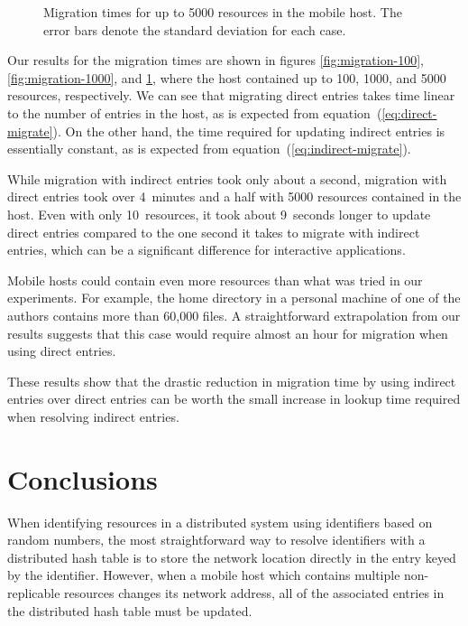 \documentclass{article}
\begin{document}
\begin{figure}
  \centering
  \caption{Migration times for up to 5000 resources in the mobile
    host.  The error bars denote the standard deviation for each
    case.}
  \label{fig:migration-5000}
\end{figure}

Our results for the migration times are shown in figures
\ref{fig:migration-100}, \ref{fig:migration-1000}, and
\ref{fig:migration-5000}, where the host contained up to 100, 1000,
and 5000 resources, respectively.  We can see that migrating direct
entries takes time linear to the number of entries in the host, as is
expected from equation~(\ref{eq:direct-migrate}).  On the other hand,
the time required for updating indirect entries is essentially
constant, as is expected from equation~(\ref{eq:indirect-migrate}).

While migration with indirect entries took only about a second,
migration with direct entries took over 4~minutes and a half with 5000
resources contained in the host.  Even with only 10~resources, it took
about 9~seconds longer to update direct entries compared to the one
second it takes to migrate with indirect entries, which can be a
significant difference for interactive applications.

Mobile hosts could contain even more resources than what was tried in
our experiments.  For example, the home directory in a personal
machine of one of the authors contains more than 60,000 files.  A
straightforward extrapolation from our results suggests that this case
would require almost an hour for migration when using direct entries.

These results show that the drastic reduction in migration time by
using indirect entries over direct entries can be worth the small
increase in lookup time required when resolving indirect entries.


\section{Conclusions}
\label{sec:conclude}

When identifying resources in a distributed system using identifiers
based on random numbers, the most straightforward way to resolve
identifiers with a distributed hash table is to store the network
location directly in the entry keyed by the identifier.  However, when
a mobile host which contains multiple non-replicable resources changes
its network address, all of the associated entries in the distributed
hash table must be updated.
\end{document}
